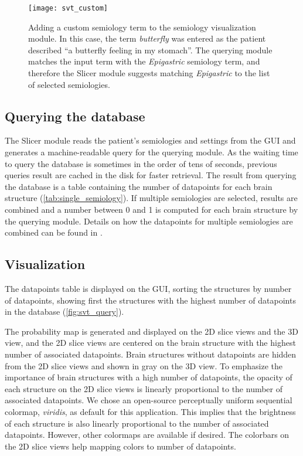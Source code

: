 \begin{figure}
  \centering
  \texttt{[image: svt\_custom]}
  \caption[Adding a custom semiology to the semiology visualization module]{
    Adding a custom semiology term to the semiology visualization module.
    In this case, the term \textit{butterfly} was entered as the patient described ``a butterfly feeling in my stomach''.
    The querying module matches the input term with the \textit{Epigastric} semiology term, and therefore the Slicer module suggests matching \textit{Epigastric} to the list of selected semiologies.
  }
  \label{fig:svt_custom}
\end{figure}


\subsection{Querying the database}
\label{sec:svt_querying}

The Slicer module reads the patient's semiologies and settings from the \ac{GUI} and generates a machine-readable query for the querying module.
As the waiting time to query the database is sometimes in the order of tens of seconds, previous queries result are cached in the disk for faster retrieval.
The result from querying the database is a table containing the number of datapoints for each brain structure (\cref{tab:single_semiology}).
If multiple semiologies are selected, results are combined and a number between 0 and 1 is computed for each brain structure by the querying module.
Details on how the datapoints for multiple semiologies are combined can be found in \cite{alim-marvasti_mapping_2021}.


\subsection{Visualization}
\label{sec:svt_visualization}

The datapoints table is displayed on the \ac{GUI}, sorting the structures by number of datapoints, showing first the structures with the highest number of datapoints in the database (\cref{fig:svt_query}).

The probability map is generated and displayed on the 2D slice views and the 3D view, and the 2D slice views are centered on the brain structure with the highest number of associated datapoints.
Brain structures without datapoints are hidden from the 2D slice views and shown in gray on the 3D view.
To emphasize the importance of brain structures with a high number of datapoints, the opacity of each structure on the 2D slice views is linearly proportional to the number of associated datapoints.
We chose an open-source perceptually uniform sequential colormap, \textit{viridis}, as default for this application.
This implies that the brightness of each structure is also linearly proportional to the number of associated datapoints.
However, other colormaps are available if desired.
The colorbars on the 2D slice views help mapping colors to number of datapoints.

